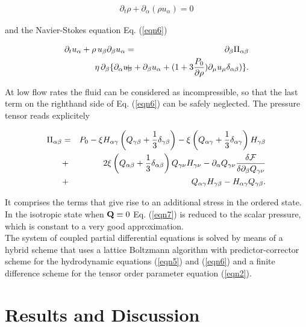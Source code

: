 \documentclass[aps,pre,twocolumn,groupedaddress]{revtex4-1}
\begin{document}
\begin{eqnarray}
\partial_t \rho + \partial_\alpha (\rho u_\alpha)=0
\label{eqn5}
\end{eqnarray}

and the Navier-Stokes equation Eq. (\ref{eqn6})

\begin{eqnarray}
\partial_t u_\alpha +\rho \,u_\beta \partial_\beta u_\alpha&=&\partial_\beta \Pi_{\alpha \beta}\nonumber\\
&+&\hspace*{-2cm}\eta\, \partial_\beta \{ \partial_\alpha u_\beta + \partial_\beta u_\alpha +(1+3\frac{P_0}{\partial \rho} )\partial_\mu u_\mu \delta_{\alpha \beta})\}. 
\label{eqn6}
\end{eqnarray}

At low flow rates the fluid can be considered as incompressible, so that the last term on the righthand side of Eq. (\ref{eqn6}) can be safely neglected.
The pressure tensor reads explicitely

\begin{eqnarray}
\Pi_{\alpha \beta}&=&P_0-\xi H_{\alpha \gamma}\left(Q_{\gamma \beta} +\frac{1}{3} \delta_{\gamma \beta}\right)-\xi \left(Q_{\alpha \gamma} +\frac{1}{3} \delta_{\alpha \gamma}\right) H_{\gamma \beta}\nonumber\\
&+& 2 \xi  \left(Q_{\alpha \beta} +\frac{1}{3} \delta_{\alpha \beta}\right) Q_{\gamma \nu} H_{\gamma \nu}-\partial_\alpha Q_{\gamma \nu} \frac{\delta{\cal F}}{\delta \partial_{\beta} Q_{\gamma \nu}}\nonumber\\
&+&Q_{\alpha \gamma}H_{\gamma \beta}-H_{\alpha \gamma} Q_{\gamma \beta}.
\label{eqn7}
\end{eqnarray}

It comprises the terms that give rise to an additional stress in the ordered state.
In the isotropic state when ${\bf Q}\equiv 0$ Eq. (\ref{eqn7}) is reduced to the scalar pressure, which is constant to a very good approximation.\\ 
The system of coupled partial differential equations is solved by means of a hybrid scheme \cite{Denniston:2004, Marenduzzo:2008} that uses a lattice Boltzmann algorithm with predictor-corrector scheme for the hydrodynamic equations (\ref{eqn5}) and (\ref{eqn6}) and a finite difference scheme for the tensor order parameter equation (\ref{eqn2}).


\section{Results and Discussion}
\end{document}
